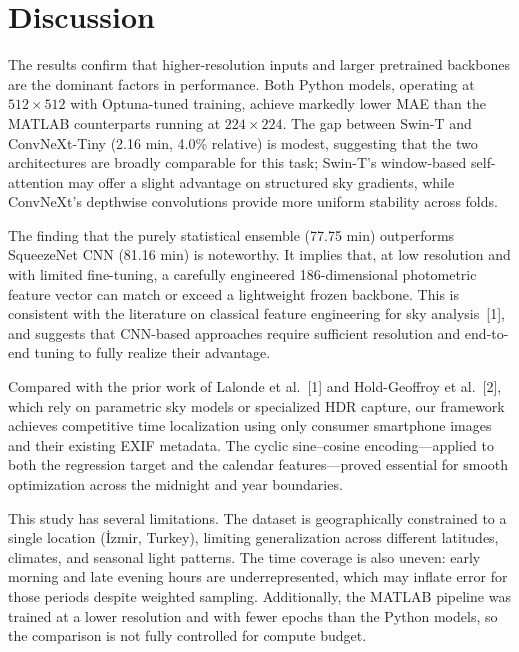 \documentclass[9pt, a4paper, twocolumn]{article}
\begin{document}
\section{Discussion}

The results confirm that higher-resolution inputs and larger pretrained backbones are the dominant factors in performance. Both Python models, operating at $512\times512$ with Optuna-tuned training, achieve markedly lower MAE than the MATLAB counterparts running at $224\times224$. The gap between Swin-T and ConvNeXt-Tiny (2.16 min, 4.0\% relative) is modest, suggesting that the two architectures are broadly comparable for this task; Swin-T's window-based self-attention may offer a slight advantage on structured sky gradients, while ConvNeXt's depthwise convolutions provide more uniform stability across folds.

The finding that the purely statistical ensemble (77.75 min) outperforms SqueezeNet CNN (81.16 min) is noteworthy. It implies that, at low resolution and with limited fine-tuning, a carefully engineered 186-dimensional photometric feature vector can match or exceed a lightweight frozen backbone. This is consistent with the literature on classical feature engineering for sky analysis~[1], and suggests that CNN-based approaches require sufficient resolution and end-to-end tuning to fully realize their advantage.

Compared with the prior work of Lalonde et al.~[1] and Hold-Geoffroy et al.~[2], which rely on parametric sky models or specialized HDR capture, our framework achieves competitive time localization using only consumer smartphone images and their existing EXIF metadata. The cyclic sine--cosine encoding---applied to both the regression target and the calendar features---proved essential for smooth optimization across the midnight and year boundaries.

This study has several limitations. The dataset is geographically constrained to a single location (İzmir, Turkey), limiting generalization across different latitudes, climates, and seasonal light patterns. The time coverage is also uneven: early morning and late evening hours are underrepresented, which may inflate error for those periods despite weighted sampling. Additionally, the MATLAB pipeline was trained at a lower resolution and with fewer epochs than the Python models, so the comparison is not fully controlled for compute budget.
\end{document}
